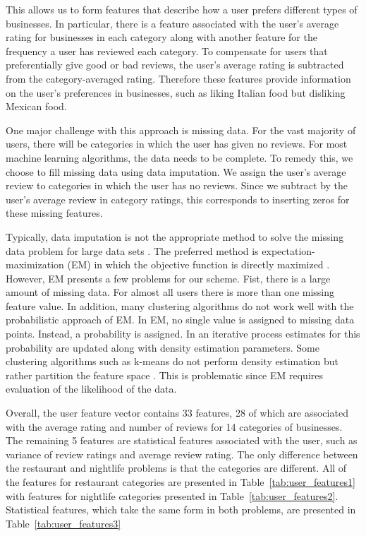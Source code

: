 \documentclass[11pt]{article}
\begin{document}
This allows us to form features that describe how a user prefers different types of businesses. In particular, there is a feature associated with the user's average rating for businesses in each category along with another feature for the frequency a user has reviewed each category. To compensate for users that preferentially give good or bad reviews, the user's average rating is subtracted from the category-averaged rating. Therefore these features provide information on the user's preferences in businesses, such as liking Italian food but disliking Mexican food.

One major challenge with this approach is missing data. For the vast majority of users, there will be categories in which the user has given no reviews. For most machine learning algorithms, the data needs to be complete. To remedy this, we choose to fill missing data using data imputation. We assign the user's average review to categories in which the user has no reviews. Since we subtract by the user's average review in category ratings, this corresponds to inserting zeros for these missing features. 

Typically, data imputation is not the appropriate method to solve the missing data problem for large data sets \cite{em_vs_im}. The preferred method is expectation-maximization (EM) in which the objective function is directly maximized \cite{em}. However, EM presents a few problems for our scheme. Fist, there is a large amount of missing data. For almost all users there is more than one missing feature value. In addition, many clustering algorithms do not work well with the probabilistic approach of EM. In EM, no single value is assigned to missing data points. Instead, a probability is assigned. In an iterative process estimates for this probability are updated along with density estimation parameters. Some clustering algorithms such as k-means do not perform density estimation but rather partition the feature space \cite{kmeans}. This is problematic since EM requires evaluation of the likelihood of the data.

Overall, the user feature vector contains 33 features, 28 of which are associated with the average rating and number of reviews for 14 categories of businesses. The remaining 5 features are statistical features associated with the user, such as variance of review ratings and average review rating. The only difference between the restaurant and nightlife problems is that the categories are different. All of the features for restaurant categories are presented in Table~\ref{tab:user_features1} with features for nightlife categories presented in Table~\ref{tab:user_features2}. Statistical features, which take the same form in both problems, are presented in Table~\ref{tab:user_features3}
\end{document}
